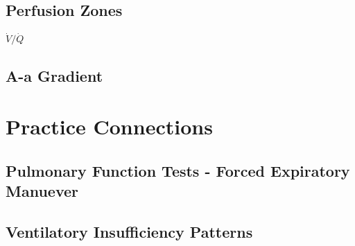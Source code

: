 \subsection{Perfusion Zones}
$\dot{V}/\dot{Q}$

\subsection{A-a Gradient}

\section{Practice Connections}

\subsection{Pulmonary Function Tests - Forced Expiratory Manuever}

\subsection{Ventilatory Insufficiency Patterns}

\printbibliography[heading=subbibintoc]
